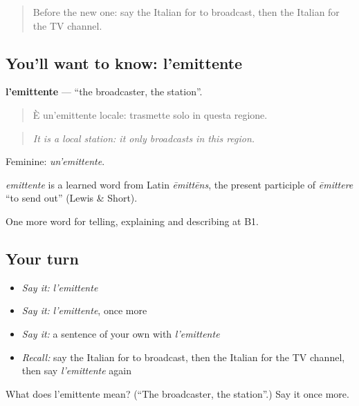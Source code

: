 \label{lesson:IT-C287-emittente}



\begin{quote}
Before the new one: say the Italian for to broadcast, then the Italian for the TV channel.
\end{quote}

\subsection*{You'll want to know: l'emittente}
\textbf{l'emittente} — \textquotedblleft{}the broadcaster, the station\textquotedblright{}.

\begin{quote}
È un'emittente locale: trasmette solo in questa regione.
\end{quote}

\begin{quote}
\emph{It is a local station: it only broadcasts in this region.}
\end{quote}

Feminine: \emph{un'emittente}.

\begin{cousinweb}
\emph{emittente} is a learned word from Latin \emph{ēmittēns}, the present participle of \emph{ēmittere} \textquotedblleft{}to send out\textquotedblright{} (Lewis \& Short).
\end{cousinweb}

\begin{grammarlens}[title={What you've built}]
One more word for telling, explaining and describing at B1.
\end{grammarlens}

\subsection*{Your turn}
\begin{itemize}
\raggedright
  \item \emph{Say it:} \emph{l'emittente}
  \item \emph{Say it:} \emph{l'emittente}, once more
  \item \emph{Say it:} a sentence of your own with \emph{l'emittente}
  \item \emph{Recall:} say the Italian for to broadcast, then the Italian for the TV channel, then say \emph{l'emittente} again
\end{itemize}

\begin{tcolorbox}[breakable,colback=teal!4,colframe=teal!35!black,title={Before you move on}]
What does l'emittente mean? (\textquotedblleft{}The broadcaster, the station\textquotedblright{}.) Say it once more.
\end{tcolorbox}
